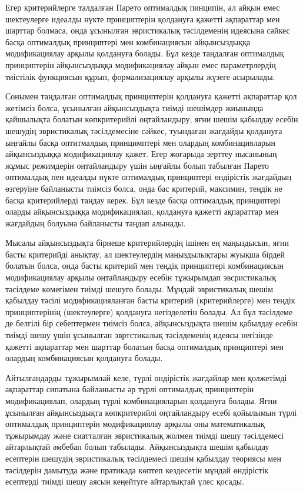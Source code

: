 Егер критерийлерге талдалған Парето оптималдық пинципін, ал айқын емес
шектеулерге идеалды нүкте принциптерін қолдануға қажетті ақпараттар мен
шарттар болмаса, онда ұсынылған эвристикалық тәсілдеменің идеясына
сәйкес басқа оптималдық принциптері мен комбинациясын айқынсыздыққа
модификациялау арқылы қолдануға болады. Бұл кезде таңдалған оптималдық
принциптерін айқынсыздыққа модификациялау айқын емес параметрлердің
тиістілік функциясын құрып, формализациялау арқылы жүзеге асырылады.

Сонымен таңдалған оптималдық принциптерін қолдануға қажетті ақпараттар
қол жетімсіз болса, ұсынылған айқынсыздықта тиімді шешімдер жиынында
қайшылықта болатын көпкритерийлі оңтайландыру, яғни шешім қабылдау
есебін шешудің эвристикалық тәсілдемесіне сәйкес, туындаған жағдайды
қолдануға ыңғайлы басқа оптитмалдық принцимптері мен олардың
комбинацияларын айқынсыздыққа модификациялау қажет. Егер жоғарыда
зерттеу нысанының жұмыс режимдерін оңтайландыру үшін ыңғайлы болып
табылған Парето оптималдық пен идеалды нүкте оптималдық принциптері
өндірістік жағдайдың өзгеруіне байланысты тиімсіз болса, онда бас
критерий, максимин, теңдік не басқа критерийлерді таңдау керек. Бұл
кезде басқа оптималдық принциптері оларды айқынсыздыққа модификациялап,
қолдануға қажетті ақпараттар мен жағдайдың болуына байланысты таңдап
алынады.

Мысалы айқынсыздықта бірнеше критерийлердің ішінен ең маңыздысын, яғни
басты критерийді анықтау, ал шектеулердің маңыздылықтары жуықша бірдей
болатын болса, онда басты критерий мен теңдік принциптері комбинациясын
модификациялау арқылы оңтайландыру есебін тұжырымдап эвсристикалық
тәсілдеме көмегімен тиімді шешуго болады. Мұндай эвристикалық шешім
қабылдау тәсілі модификацияланған басты критерий (критерийлерге) мен
теңдік принциптерінің (шектеулерге) қолдануға негізделетін болады. Ал
бұл тәсілдеме де белгілі бір себептермен тиімсіз болса, айқынсыздықта
шешім қабылдау есебін тиімді шешу үшін ұсынылған эвртстикалық
тәсілдеменің идеясы негізінде қажетті ақпараттар мен шарттар болатын
басқа оптималдық принциптері мен олардың комбинациясын қолдануға болады.

Айтылғандарды тұжырымлай келе, түрлі өндірістік жағдайлар мен қолжетімді
ақпараттар сипатына байланысты әр түрлі оптималдық принциптерін
модификациялап, олардың түрлі комбинацияларын қолдануға болады. Яғни
ұсынылған айқынсыздықта көпкритерийлі оңтайландыру есебі қойылымын түрлі
оптималдық принциптерін модификациялау арқылы оны математикалық
тұжырымдау және сиатталған эвристикалық жолмен тиімді шешу тәсілдемесі
айтарлықтай әмбебап болып табылады. Айқынсыздықта шешім қабылдау
есептерін шешудің эвристикалық тәсілдемесі шешім қабылдау теориясы мен
тәсілдерін дамытуда және пратикада көптеп кездесетін мұндай өндірістік
есептерді тиімді шешу аясын кеңейтуге айтарлықтай үлес қосады.

